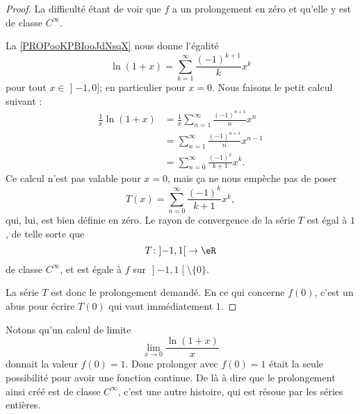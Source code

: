 \begin{proof}
	La difficulté étant de voir que \( f\) a un prolongement en zéro et qu'elle y est de classe \(  C^{\infty}\).

	La \ref{PROPooKPBIooJdNsqX} nous donne l'égalité
	\begin{equation}
		\ln(1+x)=\sum_{k=1}^{\infty}\frac{ (-1)^{k+1} }{ k }x^k
	\end{equation}
	pour tout \( x\in \mathopen] -1 , 0 \mathclose]\); en particulier pour \( x=0\). Nous faisons le petit calcul suivant :
	\begin{subequations}        \label{SUBEQooRLQOooEzNFDp}
		\begin{align}
			\frac{1}{ x }\ln(1+x) & = \frac{1}{ x }\sum_{n=1}^{\infty}\frac{ (-1)^{n+1} }{ n }x^n \\
			                      & =\sum_{n=1}^{\infty}\frac{ (-1)^{n+1} }{ n }x^{n-1}           \\
			                      & =\sum_{n=0}^{\infty}\frac{ (-1)^k }{ k+1 }x^k.
		\end{align}
	\end{subequations}
	Ce calcul n'est pas valable pour \( x=0\), mais ça ne nous empèche pas de poser
	\begin{equation}
		T(x)=\sum_{n=0}^{\infty}\frac{ (-1)^k }{ k+1 }x^k,
	\end{equation}
	qui, lui, est bien définie en zéro. Le rayon de convergence de la série \( T\) est égal à \( 1\), de telle sorte que
	\begin{equation}
		T\colon \mathopen] -1 , 1 \mathclose[\to \eR \\
	\end{equation}
	de classe \(  C^{\infty}\), et est égale à \( f\) sur \( \mathopen] -1 , 1 \mathclose[\setminus\{ 0 \}\).

	La série \( T\) est donc le prolongement demandé. En ce qui concerne \( f(0)\), c'est un abus pour écrire \( T(0)\) qui vaut immédiatement \( 1\).
\end{proof}

Notons qu'un calcul de limite
\begin{equation}
	\lim_{x\to 0} \frac{ \ln(1+x) }{ x }
\end{equation}
donnait la valeur \( f(0)=1\). Donc prolonger avec \( f(0)=1\) était la seule possibilité pour avoir une fonction continue. De là à dire que le prolongement ainsi créé est de classe \(  C^{\infty}\), c'est une autre histoire, qui est résoue par les séries entières.

